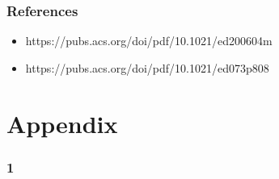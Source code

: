 \documentclass{article}
\begin{document}
  \subsubsection*{References}
  \begin{itemize}
    \item https://pubs.acs.org/doi/pdf/10.1021/ed200604m
    \item https://pubs.acs.org/doi/pdf/10.1021/ed073p808
  \end{itemize}
\newpage
\section*{Appendix}
\subsubsection*{1}
\end{document}
